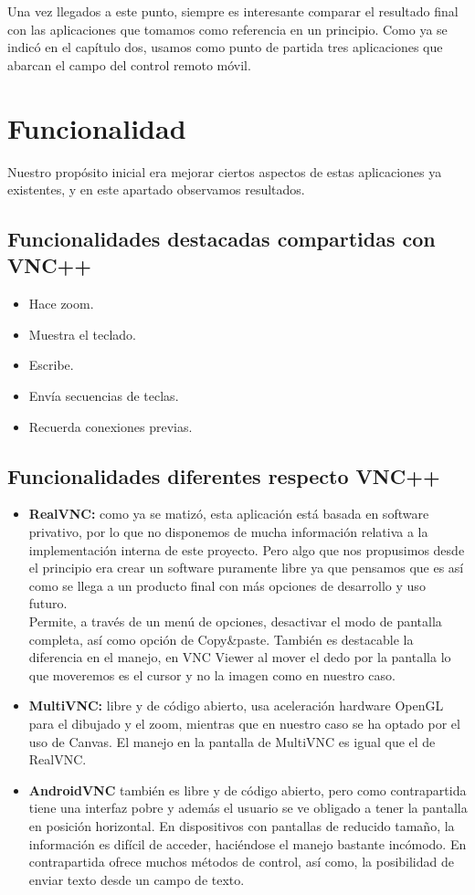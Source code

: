 Una vez llegados a este punto, siempre es interesante comparar el resultado final con las aplicaciones que tomamos como referencia en un principio. Como ya se indicó en el capítulo dos, usamos como punto de partida tres aplicaciones que abarcan el campo del control remoto móvil.

\section{Funcionalidad}

Nuestro propósito inicial era mejorar ciertos aspectos de estas aplicaciones ya existentes, y en este apartado observamos resultados.

\subsection{Funcionalidades destacadas compartidas con VNC++}
\begin{itemize}
\item Hace zoom.
\item Muestra el teclado.
\item Escribe.
\item Envía secuencias de teclas.
\item Recuerda conexiones previas.
\end{itemize}
\subsection{Funcionalidades diferentes respecto VNC++}
\begin{itemize}
\item \textbf{RealVNC:} como ya se matizó, esta aplicación está basada en software privativo, por lo que no disponemos de mucha información relativa a la implementación interna de este proyecto. Pero algo que nos propusimos desde el principio era crear un software puramente libre ya que pensamos que es así como se llega a un producto final con más opciones de desarrollo y uso futuro.\\

Permite, a través de un menú de opciones, desactivar el modo de pantalla completa, así como opción de Copy\&paste. También es destacable la diferencia en el manejo, en VNC Viewer al mover el dedo por la pantalla lo que moveremos es el cursor y no la imagen como en nuestro caso.
\item \textbf{MultiVNC:} libre y de código abierto, usa aceleración hardware OpenGL para el dibujado y el zoom, mientras que en nuestro caso se ha optado por el uso de Canvas. El manejo en la pantalla de MultiVNC es igual que el de RealVNC.
\item \textbf{AndroidVNC} también es libre y de código abierto, pero como contrapartida tiene una interfaz pobre y además el usuario se ve obligado a tener la pantalla en posición horizontal. En dispositivos con pantallas de reducido tamaño, la información es difícil de acceder, haciéndose el manejo bastante incómodo. En contrapartida ofrece muchos métodos de control, así como, la posibilidad de enviar texto desde un campo de texto.
\end{itemize}
